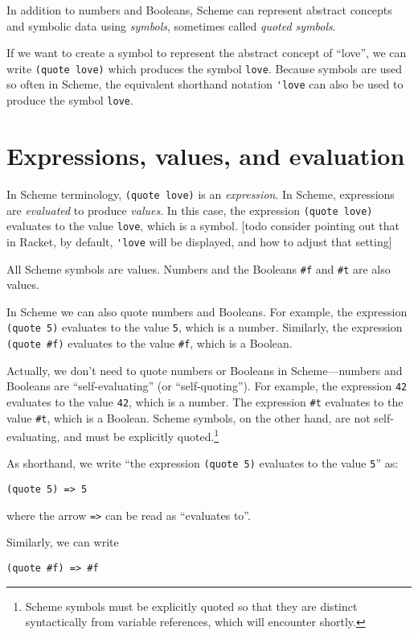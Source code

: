 \documentclass{book}
\begin{document}
In addition to numbers and Booleans, Scheme can represent abstract concepts and symbolic data using \emph{symbols}, sometimes called \emph{quoted symbols}.

If we want to create a symbol to represent the abstract concept of ``love'', we can write \verb|(quote love)| which produces the symbol \verb|love|.  Because symbols are used so often in Scheme, the equivalent shorthand notation \verb|'love| can also be used to produce the symbol \verb|love|.

\section{Expressions, values, and evaluation}

In Scheme terminology, \verb|(quote love)| is an \emph{expression}.
In Scheme, expressions are \emph{evaluated} to produce \emph{values}.
In this case, the expression \verb|(quote love)| evaluates to the value \verb|love|, which is a symbol. [todo consider pointing out that in Racket, by default, \verb|'love| will be displayed, and how to adjust that setting]

All Scheme symbols are values.  Numbers and the Booleans \verb|#f| and \verb|#t| are also values.

In Scheme we can also quote numbers and Booleans.
%
For example, the expression \verb|(quote 5)| evaluates to the value \verb|5|, which is a number.
%
Similarly, the expression \verb|(quote #f)| evaluates to the value \verb|#f|, which is a Boolean.

Actually, we don't need to quote numbers or Booleans in Scheme---numbers and Booleans are ``self-evaluating'' (or ``self-quoting'').  For example, the expression \verb|42| evaluates to the value \verb|42|, which is a number.  The expression \verb|#t| evaluates to the value \verb|#t|, which is a Boolean.  Scheme symbols, on the other hand, are not self-evaluating, and must be explicitly quoted.\footnote{Scheme symbols must be explicitly quoted so that they are distinct syntactically from variable references, which will encounter shortly.}

As shorthand, we write ``the expression \verb|(quote 5)| evaluates to the value \verb|5|'' as:

\verb|(quote 5) => 5|

\noindent
where the arrow \verb|=>| can be read as ``evaluates to''.

Similarly, we can write

\verb|(quote #f) => #f|
\end{document}
